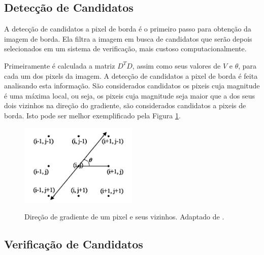 \subsection{Detecção de Candidatos}


A detecção de candidatos a pixel de borda é o primeiro passo para obtenção da imagem de borda. Ela filtra a imagem em busca de candidatos que serão depois selecionados em um sistema de verificação, mais custoso computacionalmente.

Primeiramente é calculada a matriz $D^TD$, assim como seus valores de $V$ e $\theta$, para cada um dos pixels da imagem. A detecção de candidatos a pixel de borda é feita analisando esta informação. São considerados candidatos os pixeis cuja magnitude é uma máxima local, ou seja, os pixeis cuja magnitude seja maior que a dos seus dois vizinhos na direção do gradiente, são considerados candidatos a pixeis de borda. Isto pode ser melhor exemplificado pela Figura \ref{maxlocal}.


\begin{figure} [h]
\centering
\includegraphics[width = 0.5\textwidth]{figuras/vizinh.jpg} \label{maxlocal}
\caption{Direção de gradiente de um pixel e seus vizinhos. Adaptado de \cite{mrf}.}
\end{figure}

\subsection{Verificação de Candidatos}

